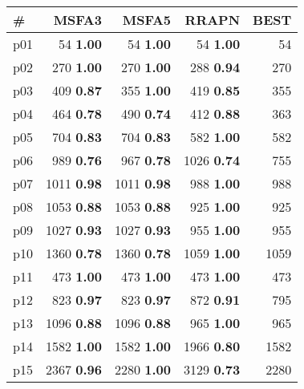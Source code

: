 \begin{tabular}{|l|rrr|r|}
\hline
\textbf{\#} & \textbf{MSFA3} & \textbf{MSFA5} & \textbf{RRAPN} & \textbf{BEST}\\
\hline
p01 & {\footnotesize 54} \textbf{1.00} & {\footnotesize 54} \textbf{1.00} & {\footnotesize 54} \textbf{1.00} & 54\\
p02 & {\footnotesize 270} \textbf{1.00} & {\footnotesize 270} \textbf{1.00} & {\footnotesize 288} \textbf{0.94} & 270\\
p03 & {\footnotesize 409} \textbf{0.87} & {\footnotesize 355} \textbf{1.00} & {\footnotesize 419} \textbf{0.85} & 355\\
p04 & {\footnotesize 464} \textbf{0.78} & {\footnotesize 490} \textbf{0.74} & {\footnotesize 412} \textbf{0.88} & 363\\
p05 & {\footnotesize 704} \textbf{0.83} & {\footnotesize 704} \textbf{0.83} & {\footnotesize 582} \textbf{1.00} & 582\\
p06 & {\footnotesize 989} \textbf{0.76} & {\footnotesize 967} \textbf{0.78} & {\footnotesize 1026} \textbf{0.74} & 755\\
p07 & {\footnotesize 1011} \textbf{0.98} & {\footnotesize 1011} \textbf{0.98} & {\footnotesize 988} \textbf{1.00} & 988\\
p08 & {\footnotesize 1053} \textbf{0.88} & {\footnotesize 1053} \textbf{0.88} & {\footnotesize 925} \textbf{1.00} & 925\\
p09 & {\footnotesize 1027} \textbf{0.93} & {\footnotesize 1027} \textbf{0.93} & {\footnotesize 955} \textbf{1.00} & 955\\
p10 & {\footnotesize 1360} \textbf{0.78} & {\footnotesize 1360} \textbf{0.78} & {\footnotesize 1059} \textbf{1.00} & 1059\\
p11 & {\footnotesize 473} \textbf{1.00} & {\footnotesize 473} \textbf{1.00} & {\footnotesize 473} \textbf{1.00} & 473\\
p12 & {\footnotesize 823} \textbf{0.97} & {\footnotesize 823} \textbf{0.97} & {\footnotesize 872} \textbf{0.91} & 795\\
p13 & {\footnotesize 1096} \textbf{0.88} & {\footnotesize 1096} \textbf{0.88} & {\footnotesize 965} \textbf{1.00} & 965\\
p14 & {\footnotesize 1582} \textbf{1.00} & {\footnotesize 1582} \textbf{1.00} & {\footnotesize 1966} \textbf{0.80} & 1582\\
p15 & {\footnotesize 2367} \textbf{0.96} & {\footnotesize 2280} \textbf{1.00} & {\footnotesize 3129} \textbf{0.73} & 2280\\

\end{tabular}

